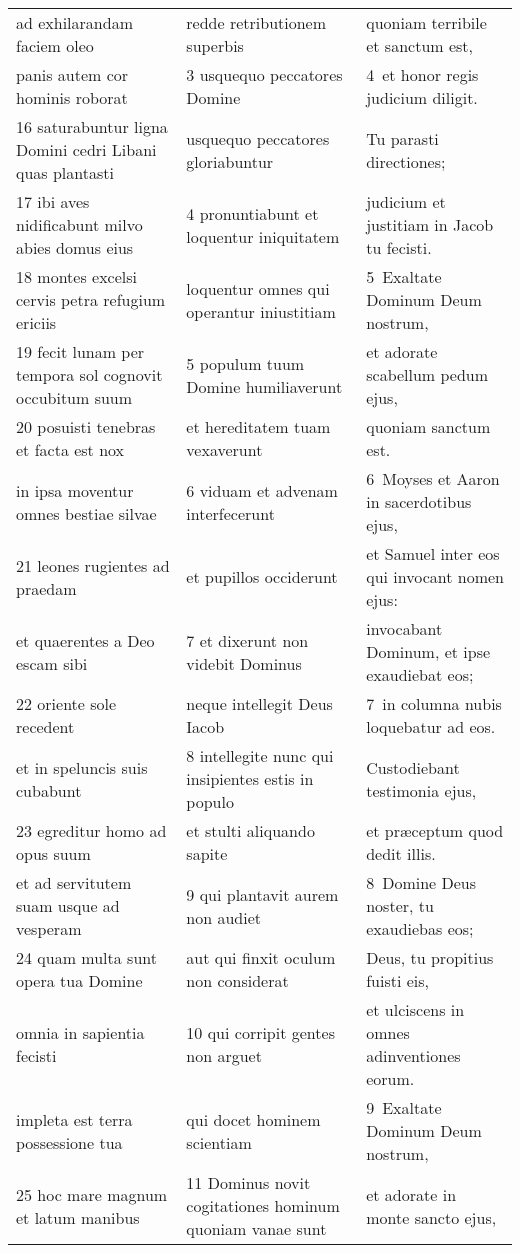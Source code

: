 \documentclass{article}
\begin{document}
\begin{longtable}{@{}p{}p{}p{}@{}}
ad exhilarandam faciem oleo	&	redde retributionem superbis	&	quoniam terribile et sanctum est,	\\
panis autem cor hominis roborat	&	3 usquequo peccatores Domine	&	4 et honor regis judicium diligit.	\\
16 saturabuntur ligna Domini cedri Libani quas plantasti	&	usquequo peccatores gloriabuntur	&	Tu parasti directiones;	\\
17 ibi aves nidificabunt milvo abies domus eius	&	4 pronuntiabunt et loquentur iniquitatem	&	judicium et justitiam in Jacob tu fecisti.	\\
18 montes excelsi cervis petra refugium ericiis	&	loquentur omnes qui operantur iniustitiam	&	5 Exaltate Dominum Deum nostrum,	\\
19 fecit lunam per tempora sol cognovit occubitum suum	&	5 populum tuum Domine humiliaverunt	&	et adorate scabellum pedum ejus,	\\
20 posuisti tenebras et facta est nox	&	et hereditatem tuam vexaverunt	&	quoniam sanctum est.	\\
in ipsa moventur omnes bestiae silvae	&	6 viduam et advenam interfecerunt	&	6 Moyses et Aaron in sacerdotibus ejus,	\\
21 leones rugientes ad praedam	&	et pupillos occiderunt	&	et Samuel inter eos qui invocant nomen ejus:	\\
et quaerentes a Deo escam sibi	&	7 et dixerunt non videbit Dominus	&	invocabant Dominum, et ipse exaudiebat eos;	\\
22 oriente sole recedent	&	neque intellegit Deus Iacob	&	7 in columna nubis loquebatur ad eos.	\\
et in speluncis suis cubabunt	&	8 intellegite nunc qui insipientes estis in populo	&	Custodiebant testimonia ejus,	\\
23 egreditur homo ad opus suum	&	et stulti aliquando sapite	&	et præceptum quod dedit illis.	\\
et ad servitutem suam usque ad vesperam	&	9 qui plantavit aurem non audiet	&	8 Domine Deus noster, tu exaudiebas eos;	\\
24 quam multa sunt opera tua Domine	&	aut qui finxit oculum non considerat	&	Deus, tu propitius fuisti eis,	\\
omnia in sapientia fecisti	&	10 qui corripit gentes non arguet	&	et ulciscens in omnes adinventiones eorum.	\\
impleta est terra possessione tua	&	qui docet hominem scientiam	&	9 Exaltate Dominum Deum nostrum,	\\
25 hoc mare magnum et latum manibus	&	11 Dominus novit cogitationes hominum quoniam vanae sunt	&	et adorate in monte sancto ejus,	\\

\end{longtable}
\end{document}
